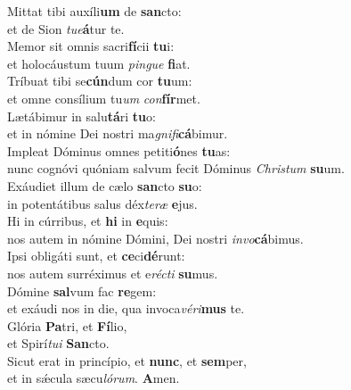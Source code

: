 \evenverse Mittat tibi auxíli\textbf{um} de \textbf{san}cto:~\*\\
\evenverse et de Sion \textit{tu}\textit{e}\textbf{á}tur te.\\
\oddverse Memor sit omnis sacri\textbf{fí}cii \textbf{tu}i:~\*\\
\oddverse et holocáustum tuum \textit{pin}\textit{gue} \textbf{fi}at.\\
\evenverse Tríbuat tibi se\textbf{cún}dum cor \textbf{tu}um:~\*\\
\evenverse et omne consílium tu\textit{um} \textit{con}\textbf{fír}met.\\
\oddverse Lætábimur in salu\textbf{tá}ri \textbf{tu}o:~\*\\
\oddverse et in nómine Dei nostri ma\textit{gni}\textit{fi}\textbf{cá}bimur.\\
\evenverse Impleat Dóminus omnes petiti\textbf{ó}nes \textbf{tu}as:~\*\\
\evenverse nunc cognóvi quóniam salvum fecit Dóminus \textit{Chri}\textit{stum} \textbf{su}um.\\
\oddverse Exáudiet illum de cælo \textbf{san}cto \textbf{su}o:~\*\\
\oddverse in potentátibus salus déx\textit{te}\textit{ræ} \textbf{e}jus.\\
\evenverse Hi in cúrribus, et \textbf{hi} in \textbf{e}quis:~\*\\
\evenverse nos autem in nómine Dómini, Dei nostri \textit{in}\textit{vo}\textbf{cá}bimus.\\
\oddverse Ipsi obligáti sunt, et \textbf{ce}ci\textbf{dé}runt:~\*\\
\oddverse nos autem surréximus et e\textit{ré}\textit{cti} \textbf{su}mus.\\
\evenverse Dómine \textbf{sal}vum fac \textbf{re}gem:~\*\\
\evenverse et exáudi nos in die, qua invoca\textit{vé}\textit{ri}\textbf{mus} te.\\
\oddverse Glória \textbf{Pa}tri, et \textbf{Fí}lio,~\*\\
\oddverse et Spirí\textit{tu}\textit{i} \textbf{San}cto.\\
\evenverse Sicut erat in princípio, et \textbf{nunc}, et \textbf{sem}per,~\*\\
\evenverse et in sǽcula sæcu\textit{ló}\textit{rum}. \textbf{A}men.\\
